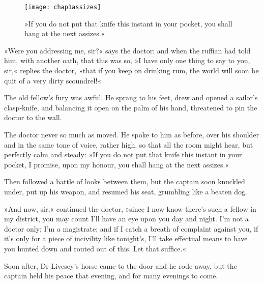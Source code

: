  \begin{figure}[p]
\centering
\texttt{[image: chap1assizes]}
\caption[»You shall hang at the next assizes.«]{»If you do not put that knife this instant in your pocket, you shall hang at the next assizes.«}
\end{figure}


»Were you addressing me, sir?« says the doctor; and when the ruffian had told him, with another oath, that this was so, »I have only one thing to say to you, sir,« replies the doctor, »that if you keep on drinking rum, the world will soon be quit of a very dirty scoundrel!«

The old fellow's fury was awful. He sprang to his feet, drew and opened a sailor's clasp-knife, and balancing it open on the palm of his hand, threatened to pin the doctor to the wall.

The doctor never so much as moved. He spoke to him as before, over his shoulder and in the same tone of voice, rather high, so that all the room might hear, but perfectly calm and steady: »If you do not put that knife this instant in your pocket, I promise, upon my honour, you shall hang at the next assizes.«


Then followed a battle of looks between them, but the captain soon knuckled under, put up his weapon, and resumed his seat, grumbling like a beaten dog.

»And now, sir,« continued the doctor, »since I now know there's such a fellow in my district, you may count I'll have an eye upon you day and night. I'm not a doctor only; I'm a magistrate; and if I catch a breath of complaint against you, if it's only for a piece of incivility like tonight's, I'll take effectual means to have you hunted down and routed out of this. Let that suffice.«

Soon after, Dr Livesey's horse came to the door and he rode away, but the captain held his peace that evening, and for many evenings to come.
